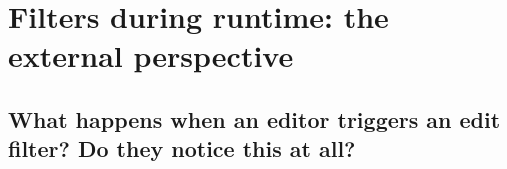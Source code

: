 \section{Filters during runtime: the external perspective}


\subsection{What happens when an editor triggers an edit filter? Do they notice this at all?}

